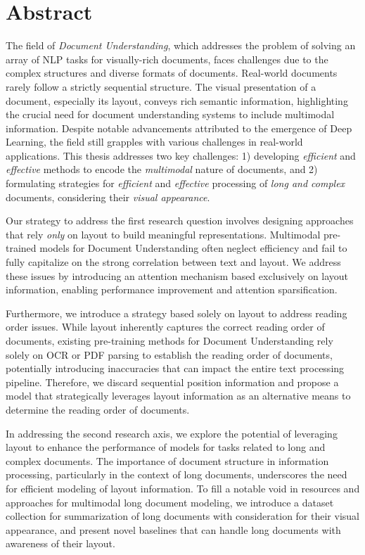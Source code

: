 \cleardoublepage
\setcounter{page}{1}

\chapter{Abstract}

The field of \emph{Document Understanding}, which addresses the problem of solving an array of \ac{NLP} tasks for visually-rich documents, faces challenges due to the complex structures and diverse formats of documents. Real-world documents rarely follow a strictly sequential structure. The visual presentation of a document, especially its layout, conveys rich semantic information, highlighting the crucial need for document understanding systems to include multimodal information. Despite notable advancements attributed to the emergence of Deep Learning, the field still grapples with various challenges in real-world applications. This thesis addresses two key challenges: 1) developing \textit{efficient} and \textit{effective} methods to encode the \textit{multimodal} nature of documents, and 2) formulating strategies for \textit{efficient} and \textit{effective} processing of \textit{long and complex} documents, considering their \textit{visual appearance}.

Our strategy to address the first research question involves designing approaches that rely \textit{only} on layout to build meaningful representations. Multimodal pre-trained models for Document Understanding often neglect efficiency and fail to fully capitalize on the strong correlation between text and layout. We address these issues by introducing an attention mechanism based exclusively on layout information, enabling performance improvement and attention sparsification.

Furthermore, we introduce a strategy based solely on layout to address reading order issues. While layout inherently captures the correct reading order of documents, existing pre-training methods for Document Understanding rely solely on \ac{OCR} or PDF parsing to establish the reading order of documents, potentially introducing inaccuracies that can impact the entire text processing pipeline. Therefore, we discard sequential position information and propose a model that strategically leverages layout information as an alternative means to determine the reading order of documents.

In addressing the second research axis, we explore the potential of leveraging layout to enhance the performance of models for tasks related to long and complex documents. The importance of document structure in information processing, particularly in the context of long documents, underscores the need for efficient modeling of layout information. To fill a notable void in resources and approaches for multimodal long document modeling, we introduce a dataset collection for summarization of long documents with consideration for their visual appearance, and present novel baselines that can handle long documents with awareness of their layout.

